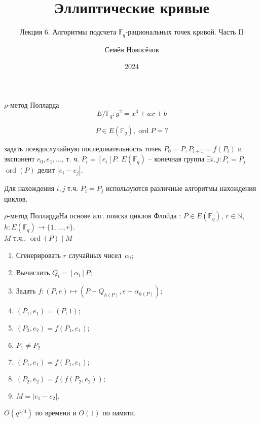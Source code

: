 \documentclass{beamer}
\title{Эллиптические кривые}
\subtitle{Лекция 6. Алгоритмы подсчета $\mathbb{F}_q$-рациональных точек кривой. Часть II}
\author{Семён Новосёлов}
\institute{БФУ им. И. Канта}
\date{2024}
\begin{document}
\frame{\titlepage}

\begin{frame}{$\rho$-метод Полларда}
\[E/\mathbb{F}_q: y^2 = x^3 + a x + b\]

\[P \in E(\mathbb{F}_q), \operatorname{ord}{P} = ?\]

 задать псевдослучайную последовательность точек $P_0 = P, P_{i+1} = f(P_{i})$ и экспонент $e_0, e_1, \ldots$, т. ч. $P_i = [e_i] P$. $E(\mathbb{F}_q)$ -- конечная группа \MyImplies $\exists i, j: P_i = P_j$ \MyImplies $\operatorname{ord}(P)$ делит $|e_i - e_j|$.

\vspace{1em}
Для нахождения $i,j$ т.ч. $P_i = P_j$ используются различные алгоритмы нахождения циклов.
\end{frame}

\begin{frame}{$\rho$-метод Полларда}{На основе алг. поиска циклов Флойда}
: $P \in E(\mathbb{F}_q)$, $r \in \mathbb{N}$, $h: E(\mathbb{F}_q) \rightarrow \{1, \ldots, r\}$. \\
 $M$ т.ч., $\operatorname{ord}(P) \mid M$\\
\begin{enumerate}
    \item Сгенерировать $r$ случайных чисел~$\alpha_i$;
    \item Вычислить $Q_i = [\alpha_i] P$;
    \item Задать $f: (P, e) \mapsto (P + Q_{h(P)}, e+\alpha_{h(P)})$;
    \item $(P_1, e_1) = (P, 1)$;
    \item $(P_2, e_2) = f(P_1, e_1)$;
    \item {} $P_1 \neq P_2$ 
    \item \quad $(P_1, e_1) = f(P_1, e_1)$;
    \item \quad $(P_2, e_2) = f(f(P_2, e_2))$;
    \item {} $M = |e_1 - e_2|$.
\end{enumerate}

\vspace{1em}
 $O({q^{1/4}})$ по времени и $O(1)$ по памяти. 
\end{frame}

%    
\end{document}
